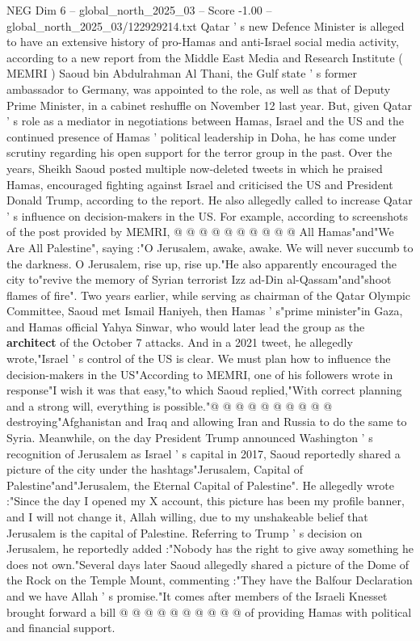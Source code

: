 \begin{textsample}{NEG Dim 6 – global\_north\_2025\_03 – Score -1.00 – global\_north\_2025\_03/122929214.txt}  \label{ex:f6_neg_168}
Qatar ' s new Defence Minister is alleged to have an extensive history of pro-Hamas and anti-Israel social media activity, according to a new report from the Middle East Media and Research Institute ( MEMRI ) Saoud bin Abdulrahman Al Thani, the Gulf state ' s former ambassador to Germany, was appointed to the role, as well as that of Deputy Prime Minister, in a cabinet reshuffle on November 12 last year.
But, given Qatar ' s role as a mediator in negotiations between Hamas, Israel and the US and the continued presence of Hamas ' political leadership in Doha, he has come under scrutiny regarding his open support for the terror group in the past.
Over the years, Sheikh Saoud posted multiple now-deleted tweets in which he praised Hamas, encouraged fighting against Israel and criticised the US and President Donald Trump, according to the report.
He also allegedly called to increase Qatar ' s influence on decision-makers in the US.
For example, according to screenshots of the post provided by MEMRI, @ @ @ @ @ @ @ @ @ @ All Hamas"and"We Are All Palestine", saying :"O Jerusalem, awake, awake.
We will never succumb to the darkness.
O Jerusalem, rise up, rise up."He also apparently encouraged the city to"revive the memory of Syrian terrorist Izz ad-Din al-Qassam"and"shoot flames of fire".
Two years earlier, while serving as chairman of the Qatar Olympic Committee, Saoud met Ismail Haniyeh, then Hamas ' s"prime minister"in Gaza, and Hamas official Yahya Sinwar, who would later lead the group as the \textbf{architect} of the October 7 attacks.
And in a 2021 tweet, he allegedly wrote,"Israel ' s control of the US is clear.
We must plan how to influence the decision-makers in the US"According to MEMRI, one of his followers wrote in response"I wish it was that easy,"to which Saoud replied,"With correct planning and a strong will, everything is possible."@ @ @ @ @ @ @ @ @ @ destroying"Afghanistan and Iraq and allowing Iran and Russia to do the same to Syria.
Meanwhile, on the day President Trump announced Washington ' s recognition of Jerusalem as Israel ' s capital in 2017, Saoud reportedly shared a picture of the city under the hashtags"Jerusalem, Capital of Palestine"and"Jerusalem, the Eternal Capital of Palestine".
He allegedly wrote :"Since the day I opened my X account, this picture has been my profile banner, and I will not change it, Allah willing, due to my unshakeable belief that Jerusalem is the capital of Palestine.
Referring to Trump ' s decision on Jerusalem, he reportedly added :"Nobody has the right to give away something he does not own."Several days later Saoud allegedly shared a picture of the Dome of the Rock on the Temple Mount, commenting :"They have the Balfour Declaration and we have Allah ' s promise."It comes after members of the Israeli Knesset brought forward a bill @ @ @ @ @ @ @ @ @ @ of providing Hamas with political and financial support.

\end{textsample}
